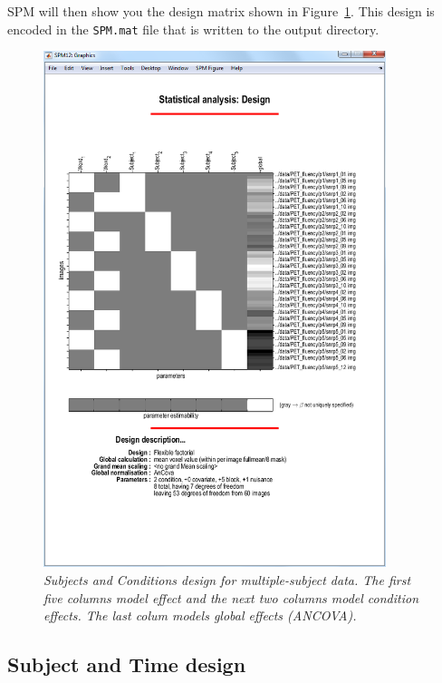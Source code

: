 SPM will then show you the design matrix shown in Figure~\ref{sc_design}. This design is encoded in the \texttt{SPM.mat} file that is written to the output directory.
\begin{figure}
\begin{center}
\includegraphics[width=100mm]{pet/sc_design}
\caption{\em Subjects and Conditions design for multiple-subject data. The first five columns model effect and the next two columns model condition effects. The last colum models global effects (ANCOVA).  \label{sc_design}}
\end{center}
\end{figure}

\subsection{Subject and Time design}


